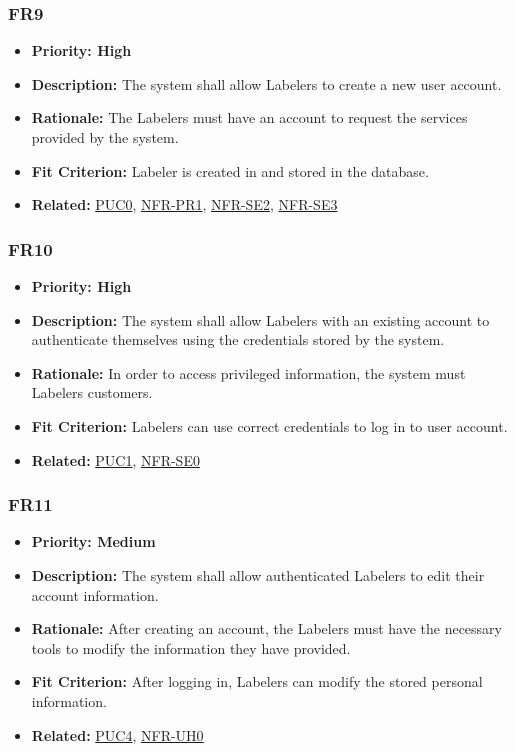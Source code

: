 \documentclass[12pt]{article}
\begin{document}
\subsubsection*{FR9}
\label{sec:FR9}
\begin{itemize}
  \item \textbf{Priority: High}
  \item \textbf{Description:} The system shall allow Labelers to create a new user account.
  \item \textbf{Rationale:} The Labelers must have an account to request the services provided by the system.
  \item \textbf{Fit Criterion:} Labeler is created in and stored in the database.
  \item \textbf{Related:} \hyperref[sec:PUC0]{PUC0}, \hyperref[sec:PR1]{NFR-PR1}, \hyperref[sec:SE2]{NFR-SE2}, \hyperref[sec:SE3]{NFR-SE3}
\end{itemize}
\subsubsection*{FR10}
\label{sec:FR10}
\begin{itemize}
  \item \textbf{Priority: High}
  \item \textbf{Description:} The system shall allow Labelers with an existing account to authenticate themselves using the credentials stored by the system.
  \item \textbf{Rationale:} In order to access privileged information, the system must Labelers customers.
\item \textbf{Fit Criterion:} Labelers can use correct credentials to log in to user account.
\item \textbf{Related:} \hyperref[sec:PUC1]{PUC1}, \hyperref[sec:SE0]{NFR-SE0}
\end{itemize}
\subsubsection*{FR11}
\label{sec:FR11}
\begin{itemize}
  \item \textbf{Priority: Medium}
  \item \textbf{Description:} The system shall allow authenticated Labelers to edit their account information.
  \item \textbf{Rationale:} After creating an account, the Labelers must have the necessary tools to modify the information they have provided.
  \item \textbf{Fit Criterion:} After logging in, Labelers can modify the stored personal information.
  \item \textbf{Related:}  \hyperref[sec:PUC4]{PUC4}, \hyperref[sec:UH0]{NFR-UH0}
\end{itemize}
\end{document}
